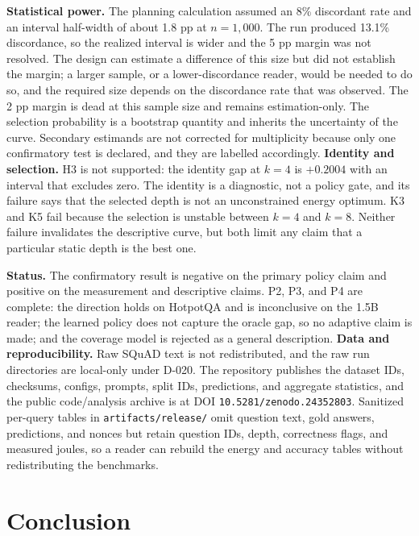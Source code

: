 \documentclass[a4paper,fleqn]{cas-sc}
\begin{document}
\textbf{Statistical power.} The planning calculation assumed an 8\% discordant rate and an interval half-width of about 1.8 pp at $n=1{,}000$. The run produced 13.1\% discordance, so the realized interval is wider and the 5 pp margin was not resolved. The design can estimate a difference of this size but did not establish the margin; a larger sample, or a lower-discordance reader, would be needed to do so, and the required size depends on the discordance rate that was observed. The 2 pp margin is dead at this sample size and remains estimation-only. The selection probability is a bootstrap quantity and inherits the uncertainty of the curve. Secondary estimands are not corrected for multiplicity because only one confirmatory test is declared, and they are labelled accordingly. \textbf{Identity and selection.} H3 is not supported: the identity gap at $k=4$ is $+0.2004$ with an interval that excludes zero. The identity is a diagnostic, not a policy gate, and its failure says that the selected depth is not an unconstrained energy optimum. K3 and K5 fail because the selection is unstable between $k=4$ and $k=8$. Neither failure invalidates the descriptive curve, but both limit any claim that a particular static depth is the best one.

\textbf{Status.} The confirmatory result is negative on the primary policy claim and positive on the measurement and descriptive claims. P2, P3, and P4 are complete: the direction holds on HotpotQA and is inconclusive on the 1.5B reader; the learned policy does not capture the oracle gap, so no adaptive claim is made; and the coverage model is rejected as a general description. \textbf{Data and reproducibility.} Raw SQuAD text is not redistributed, and the raw run directories are local-only under D-020. The repository publishes the dataset IDs, checksums, configs, prompts, split IDs, predictions, and aggregate statistics, and the public code/analysis archive is at DOI \texttt{10.5281/zenodo.24352803}. Sanitized per-query tables in \texttt{artifacts/release/} omit question text, gold answers, predictions, and nonces but retain question IDs, depth, correctness flags, and measured joules, so a reader can rebuild the energy and accuracy tables without redistributing the benchmarks.

\section{Conclusion}\label{sec:conclusion}
\end{document}
